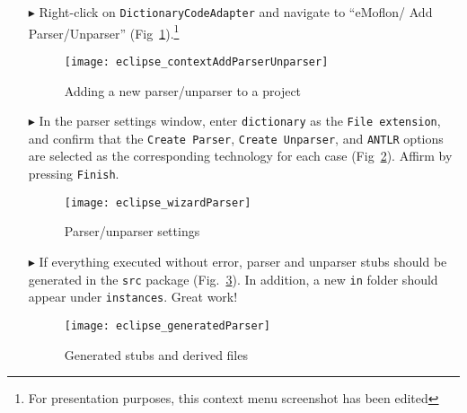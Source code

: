 \begin{itemize}

\item[$\blacktriangleright$] Right-click on \texttt{DictionaryCodeAdapter} and navigate to ``eMoflon/ Add Parser/Unparser''
(Fig~\ref{eclipse:contextParser}).\footnote{For presentation purposes, this context menu screenshot has been edited}

\vspace{0.5cm}

\begin{figure}[htpb]
\begin{center}
  \texttt{[image: eclipse\_contextAddParserUnparser]}
  \caption{Adding a new parser/unparser to a project}
  \label{eclipse:contextParser}
\end{center}
\end{figure}


\item[$\blacktriangleright$] In the parser settings window, enter \texttt{dictionary} as the \texttt{File exten\-si\-on}, and confirm that the \texttt{Create
Parser}, \texttt{Create Unparser}, and \texttt{ANTLR} options are selected as the corresponding technology for each case (Fig~\ref{eclipse:wizardParser}).
Affirm by pressing \texttt{Finish}.

\begin{figure}[htpb]
\begin{center}
  \texttt{[image: eclipse\_wizardParser]}
  \caption{Parser/unparser settings}
  \label{eclipse:wizardParser}
\end{center}
\end{figure}


\item[$\blacktriangleright$] If everything executed without error, parser and unparser stubs should be generated in the \texttt{src} package
(Fig.~\ref{eclipse:generatedParser}). In addition, a new \texttt{in} folder should appear under \texttt{instances}. Great work!

\begin{figure}[htpb]
\begin{center}
  \texttt{[image: eclipse\_generatedParser]}
  \caption{Generated stubs and derived files}
  \label{eclipse:generatedParser}
\end{center}
\end{figure}

\end{itemize}
